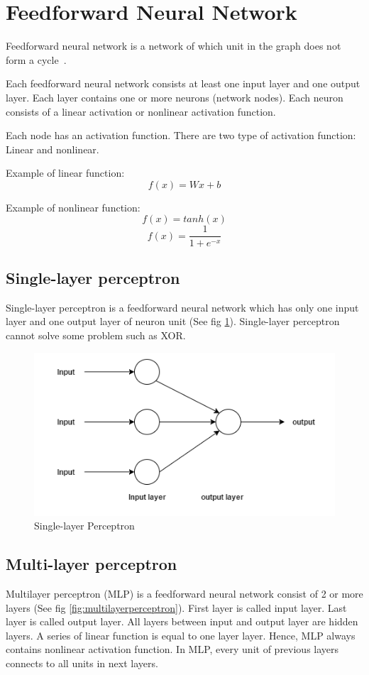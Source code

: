 \section{Feedforward Neural Network}
Feedforward neural network is a network of which unit in the graph does not form a cycle~\cite{deeplearning-book}.

Each feedforward neural network consists at least one input layer and one output layer.
Each layer contains one or more neurons (network nodes).
Each neuron consists of a linear activation or nonlinear activation function.

Each node has an activation function. There are two type of activation function: Linear and nonlinear.

Example of linear function: \\

\begin{equation} \label{eq:linearmlp}
{f(x) = Wx + b }
\end{equation}

Example of nonlinear function: \\
\[f(x) = tanh(x) \]
\[f(x) =\frac{1}{1+e^{-x}} \]

\subsection{Single-layer perceptron}
Single-layer perceptron is a feedforward neural network which has only one input layer and one output layer of neuron unit (See fig \ref{fig:singleperceptron}). Single-layer perceptron cannot solve some problem such as XOR.
\begin{figure}[H]
	\centering
	\includegraphics[width=0.7\linewidth]{figure/singleperceptron}
	\caption[Single-layer Perceptron]{Single-layer Perceptron}
	\label{fig:singleperceptron}
\end{figure}



\subsection{Multi-layer perceptron}
Multilayer perceptron (MLP) is a feedforward neural network consist of 2 or more layers (See fig \ref{fig:multilayerperceptron}).
First layer is called input layer.
Last layer is called output layer.
All layers between input and output layer are hidden layers.
A series of linear function is equal to one layer layer.
Hence, MLP always contains nonlinear activation function.
In MLP, every unit of previous layers connects to all units in next layers.

